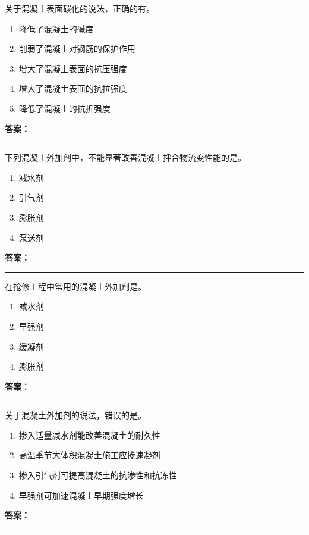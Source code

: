 \documentclass[UTF8,fontset=fandol,11pt]{ctexart}
\newcommand{\answerline}{\textcolor{answerred}{\rule{2.4cm}{0.7pt}}}
\begin{document}
\begin{quizbox}[title={第 65 题}]
关于混凝土表面碳化的说法，正确的有。\\
\begin{enumerate}[label=\Alph*.]
\item 降低了混凝土的碱度
\item 削弱了混凝土对钢筋的保护作用
\item 增大了混凝土表面的抗压强度
\item 增大了混凝土表面的抗拉强度
\item 降低了混凝土的抗折强度
\end{enumerate}
\textbf{\textcolor{answerred}{答案：}} \answerline
\end{quizbox}

\begin{quizbox}[title={第 66 题}]
下列混凝土外加剂中，不能显著改善混凝土拌合物流变性能的是。\\
\begin{enumerate}[label=\Alph*.]
\item 减水剂
\item 引气剂
\item 膨胀剂
\item 泵送剂
\end{enumerate}
\textbf{\textcolor{answerred}{答案：}} \answerline
\end{quizbox}

\begin{quizbox}[title={第 67 题}]
在抢修工程中常用的混凝土外加剂是。\\
\begin{enumerate}[label=\Alph*.]
\item 减水剂
\item 早强剂
\item 缓凝剂
\item 膨胀剂
\end{enumerate}
\textbf{\textcolor{answerred}{答案：}} \answerline
\end{quizbox}

\begin{quizbox}[title={第 68 题}]
关于混凝土外加剂的说法，错误的是。\\
\begin{enumerate}[label=\Alph*.]
\item 掺入适量减水剂能改善混凝土的耐久性
\item 高温季节大体积混凝土施工应掺速凝剂
\item 掺入引气剂可提高混凝土的抗渗性和抗冻性
\item 早强剂可加速混凝土早期强度增长
\end{enumerate}
\textbf{\textcolor{answerred}{答案：}} \answerline
\end{quizbox}
\end{document}
